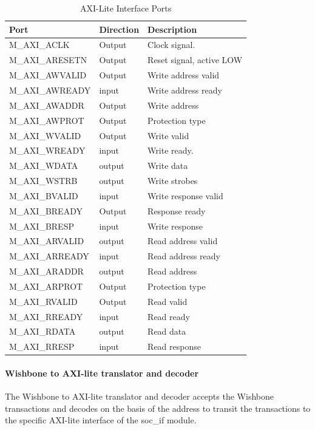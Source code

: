 \begin{table}[hbt]

\caption{AXI-Lite Interface Ports}
\begin{tabular}{|l|l|l|}
\toprule
Port  & Direction & Description  \\
\midrule
	\hline M\_AXI\_ACLK & Output & Clock signal. \\
	\hline M\_AXI\_ARESETN & Output & Reset signal, active LOW\\
	\hline M\_AXI\_AWVALID & Output & Write address valid \\
	\hline M\_AXI\_AWREADY & input & Write address ready\\
	\hline M\_AXI\_AWADDR & Output &Write address \\
	\hline M\_AXI\_AWPROT & Output & Protection type\\
	\hline M\_AXI\_WVALID & Output & Write valid \\
	\hline M\_AXI\_WREADY & input & Write ready. \\
	\hline M\_AXI\_WDATA & output & Write data\\
	\hline M\_AXI\_WSTRB & output & Write strobes\\
	\hline M\_AXI\_BVALID& input & Write response valid\\
	\hline M\_AXI\_BREADY & Output & Response ready\\
	\hline M\_AXI\_BRESP & input & Write response \\
	\hline M\_AXI\_ARVALID& output & Read address valid\\
	\hline M\_AXI\_ARREADY & input & Read address ready\\
	\hline M\_AXI\_ARADDR & output & Read address\\
	\hline M\_AXI\_ARPROT & Output & Protection type\\
	\hline M\_AXI\_RVALID & Output & Read valid\\
	\hline M\_AXI\_RREADY& input & Read ready \\
	\hline M\_AXI\_RDATA & output & Read data\\
	\hline M\_AXI\_RRESP  & input & Read response\\

\bottomrule
\end{tabular}
\label{tab:socif_southbound}
\end{table}


\paragraph{Wishbone to AXI-lite translator and decoder } 
The Wishbone to AXI-lite translator and decoder accepts the Wishbone transactions and decodes on the basis of the address to transit the transactions to the specific AXI-lite interface of the soc\_if module. \\


